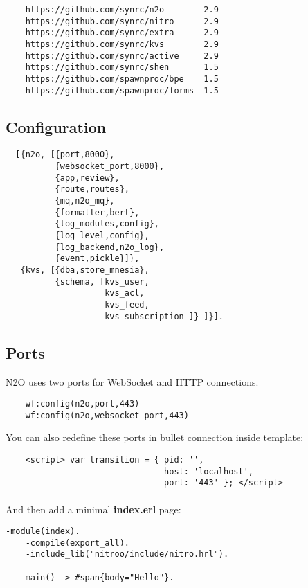 \vspace{1\baselineskip}
\begin{lstlisting}
    https://github.com/synrc/n2o        2.9
    https://github.com/synrc/nitro      2.9
    https://github.com/synrc/extra      2.9
    https://github.com/synrc/kvs        2.9
    https://github.com/synrc/active     2.9
    https://github.com/synrc/shen       1.5
    https://github.com/spawnproc/bpe    1.5
    https://github.com/spawnproc/forms  1.5
\end{lstlisting}
\vspace{1\baselineskip}

\newpage
\subsection{Configuration}

\vspace{1\baselineskip}
\begin{lstlisting}
  [{n2o, [{port,8000},
          {websocket_port,8000},
          {app,review},
          {route,routes},
          {mq,n2o_mq},
          {formatter,bert},
          {log_modules,config},
          {log_level,config},
          {log_backend,n2o_log},
          {event,pickle}]},
   {kvs, [{dba,store_mnesia},
          {schema, [kvs_user,
                    kvs_acl,
                    kvs_feed,
                    kvs_subscription ]} ]}].
\end{lstlisting}
\vspace{1\baselineskip}

\subsection*{Ports}
N2O uses two ports for WebSocket and HTTP connections.

\vspace{1\baselineskip}
\begin{lstlisting}
    wf:config(n2o,port,443)
    wf:config(n2o,websocket_port,443)
\end{lstlisting}
\vspace{1\baselineskip}

You can also redefine these ports in bullet connection inside template:

\vspace{1\baselineskip}
\begin{lstlisting}
    <script> var transition = { pid: '',
                                host: 'localhost',
                                port: '443' }; </script>
\end{lstlisting}
\vspace{1\baselineskip}

\paragraph{}
And then add a minimal {\bf index.erl} page:

\vspace{1\baselineskip}
\begin{lstlisting}[caption=index.erl]
    -module(index).
    -compile(export_all).
    -include_lib("nitroo/include/nitro.hrl").

    main() -> #span{body="Hello"}.
\end{lstlisting}
\vspace{1\baselineskip}
